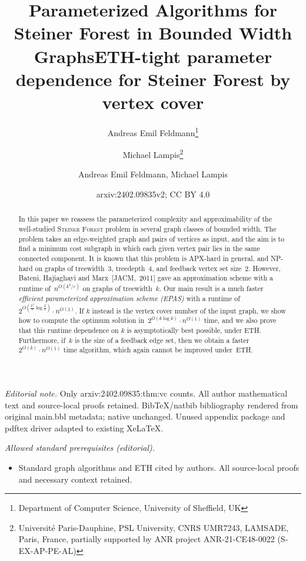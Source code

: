 \documentclass[a4paper]{article}
\title{Parameterized Algorithms for\\
Steiner Forest in Bounded Width Graphs}
\author{Andreas Emil Feldmann\thanks{Department of Computer Science, University 
of Sheffield, UK}
\and
Michael Lampis\thanks{Universit\'{e} Paris-Dauphine, PSL University, CNRS 
UMR7243, LAMSADE, Paris, France, partially supported by ANR project 
ANR-21-CE48-0022 (S-EX-AP-PE-AL)}
}
\date{}
\title{ETH-tight parameter dependence for Steiner Forest by vertex cover}
\author{Andreas Emil Feldmann, Michael Lampis}
\date{arxiv:2402.09835v2; CC BY 4.0}
\theoremstyle{plain}
\newcommand{\eps}{{\varepsilon}}
\newcommand{\pname}[1]{\textsc{#1}}
\newcommand{\SF}{\pname{Steiner Forest}\xspace}
\begin{document}
\maketitle
\noindent\textit{Editorial note.} Only arxiv:2402.09835:thm:vc counts. All author mathematical text and source-local proofs retained. BibTeX/natbib bibliography rendered from original main.bbl metadata; native unchanged. Unused appendix package and pdftex driver adapted to existing XeLaTeX.\par\medskip
\noindent\textit{Allowed standard prerequisites (editorial).}\begin{itemize}
\item Standard graph algorithms and ETH cited by authors. All source-local proofs and necessary context retained.
\end{itemize}\medskip

\maketitle
%

\begin{abstract}

In this paper we reassess the parameterized complexity and approximability of
the well-studied \SF problem in several graph classes of bounded width. The
problem takes an edge-weighted graph and pairs of vertices as input, and the
aim is to find a minimum cost subgraph in which each given vertex pair lies in
the same connected component.  It is known that this problem is APX-hard in
general, and NP-hard on graphs of treewidth~3, treedepth~4, and feedback vertex
set size~2. However, Bateni, Hajiaghayi and Marx~[JACM,~2011] gave an approximation scheme
with a runtime of~$n^{O(k^2/\eps)}$ on graphs of treewidth~$k$. Our main result
is a much faster \emph{efficient parameterized approximation scheme (EPAS)}
with a runtime of~$2^{O(\frac{k^2}{\eps}\log\frac{k}{\eps})}\cdot n^{O(1)}$. If
$k$ instead is the vertex cover number of the input graph, we show how to
compute the optimum solution in~$2^{O(k\log k)}\cdot n^{O(1)}$ time, and we
also prove that this runtime dependence on $k$ is asymptotically best possible,
under ETH.  Furthermore, if~$k$ is the size of a feedback edge set, then we
obtain a faster~$2^{O(k)}\cdot n^{O(1)}$ time algorithm, which again cannot be
improved under~ETH.

\end{abstract}

%
%
%
%
%
%
%
%
%
%
%
%
%
%
%
%
%
\end{document}
